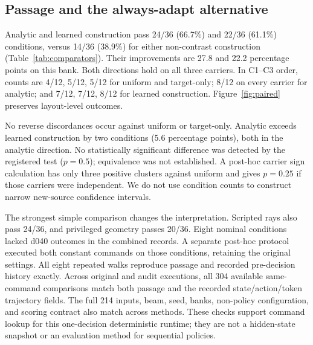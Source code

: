 \documentclass[letterpaper,10pt,conference]{ieeeconf}
\begin{document}
\subsection{Passage and the always-adapt alternative}
\begin{table}[t]
\centering\small
\caption{The same 36 nominal conditions. Requests on both-pass cases are
unnecessary for passage. Both-fail requests and refusals do not avoid failure.
The scripted and privileged geometric comparators reuse their registered
seed-8511 executions. $^{*}$Post-hoc command lookup with eight missing conditions
completed by sixteen separately registered matched executions. The outcome
oracle uses physical labels in hindsight; privileged geometry uses a forecast.}

\label{tab:comparators}
\end{table}
Analytic and learned construction pass 24/36 (66.7\%) and 22/36 (61.1\%)
conditions, versus 14/36 (38.9\%) for either non-contrast construction
(Table~\ref{tab:comparators}). Their improvements are 27.8 and 22.2 percentage
points on this bank. Both directions hold on all three carriers. In C1--C3
order, counts are 4/12, 5/12, 5/12 for uniform and target-only; 8/12 on every
carrier for analytic; and 7/12, 7/12, 8/12 for learned construction.
Figure~\ref{fig:paired} preserves layout-level outcomes.

\begin{table}[t]
\centering\footnotesize
\caption{Registered nominal paired comparisons. All four cells are shown.
The condition-level $p$-values assume independent discordances; they are
descriptive because conditions share carriers and layouts. An.: analytic;
Un.: uniform; Tgt.: target-only; M2S: Motion2Scene.}
\setlength{\tabcolsep}{3pt}

\label{tab:paired}
\end{table}
No reverse discordances occur against uniform or target-only. Analytic exceeds
learned construction by two conditions (5.6 percentage points), both in the
analytic direction. No statistically significant difference was detected by
the registered test ($p=0.5$); equivalence was not established. A post-hoc
carrier sign calculation has only three positive clusters against uniform
and gives $p=0.25$ if those carriers were independent. We do not use condition
counts to construct narrow new-source confidence intervals.

The strongest simple comparison changes the interpretation. Scripted rays
also pass 24/36, and privileged geometry passes 20/36. Eight nominal conditions
lacked d040 outcomes in the combined records. A separate post-hoc protocol
executed both constant commands on those conditions, retaining the original
settings. All eight repeated walks reproduce passage and recorded pre-decision
history exactly. Across original and audit executions, all 304 available
same-command comparisons match both passage and the recorded state/action/token
trajectory fields. The full 214 inputs, beam, seed, banks, non-policy
configuration, and scoring contract also match across methods. These checks
support command lookup for this one-decision deterministic runtime; they are
not a hidden-state snapshot or an evaluation method for sequential policies.
\end{document}

